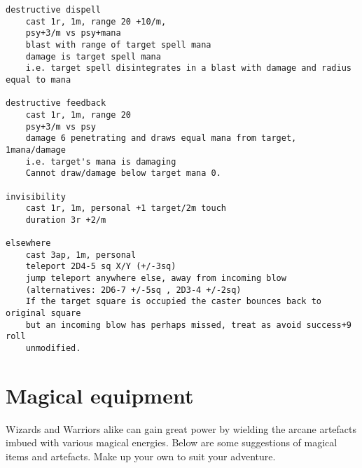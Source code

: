 \small \begin{verbatim}
destructive dispell
    cast 1r, 1m, range 20 +10/m, 
    psy+3/m vs psy+mana
    blast with range of target spell mana
    damage is target spell mana
    i.e. target spell disintegrates in a blast with damage and radius equal to mana

destructive feedback
    cast 1r, 1m, range 20
    psy+3/m vs psy
    damage 6 penetrating and draws equal mana from target, 1mana/damage
    i.e. target's mana is damaging
    Cannot draw/damage below target mana 0.

invisibility
    cast 1r, 1m, personal +1 target/2m touch
    duration 3r +2/m

elsewhere
    cast 3ap, 1m, personal
    teleport 2D4-5 sq X/Y (+/-3sq)
    jump teleport anywhere else, away from incoming blow
    (alternatives: 2D6-7 +/-5sq , 2D3-4 +/-2sq)
    If the target square is occupied the caster bounces back to original square
    but an incoming blow has perhaps missed, treat as avoid success+9 roll
    unmodified.
\end{verbatim} \normalsize


%






\section*{Magical equipment}

Wizards and Warriors alike can gain great power by wielding the arcane artefacts imbued with various magical energies. Below are some suggestions of magical items and artefacts. Make up your own to suit your adventure.

\

